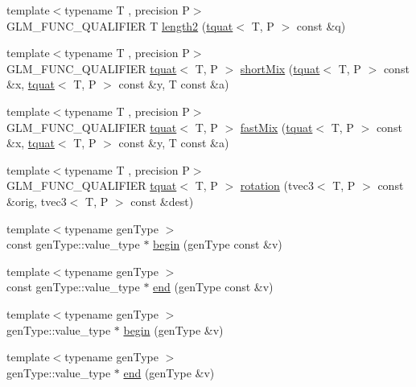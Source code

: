 \begin{DoxyCompactItemize}
\item 
{\footnotesize template$<$typename T , precision P$>$ }\\G\+L\+M\+\_\+\+F\+U\+N\+C\+\_\+\+Q\+U\+A\+L\+I\+F\+I\+E\+R T \hyperlink{group__gtx__quaternion_ga02b45352c7ac345cabc9e877314acda6}{length2} (\hyperlink{structglm_1_1tquat}{tquat}$<$ T, P $>$ const \&q)
\item 
{\footnotesize template$<$typename T , precision P$>$ }\\G\+L\+M\+\_\+\+F\+U\+N\+C\+\_\+\+Q\+U\+A\+L\+I\+F\+I\+E\+R \hyperlink{structglm_1_1tquat}{tquat}$<$ T, P $>$ \hyperlink{group__gtx__quaternion_ga3534443de2a1a806f386976546cddc81}{short\+Mix} (\hyperlink{structglm_1_1tquat}{tquat}$<$ T, P $>$ const \&x, \hyperlink{structglm_1_1tquat}{tquat}$<$ T, P $>$ const \&y, T const \&a)
\item 
{\footnotesize template$<$typename T , precision P$>$ }\\G\+L\+M\+\_\+\+F\+U\+N\+C\+\_\+\+Q\+U\+A\+L\+I\+F\+I\+E\+R \hyperlink{structglm_1_1tquat}{tquat}$<$ T, P $>$ \hyperlink{group__gtx__quaternion_gac11bf550f17d1da14423595a27575084}{fast\+Mix} (\hyperlink{structglm_1_1tquat}{tquat}$<$ T, P $>$ const \&x, \hyperlink{structglm_1_1tquat}{tquat}$<$ T, P $>$ const \&y, T const \&a)
\item 
{\footnotesize template$<$typename T , precision P$>$ }\\G\+L\+M\+\_\+\+F\+U\+N\+C\+\_\+\+Q\+U\+A\+L\+I\+F\+I\+E\+R \hyperlink{structglm_1_1tquat}{tquat}$<$ T, P $>$ \hyperlink{group__gtx__quaternion_gac4856d356c5c97cec74e9b672ea89240}{rotation} (tvec3$<$ T, P $>$ const \&orig, tvec3$<$ T, P $>$ const \&dest)
\item 
{\footnotesize template$<$typename gen\+Type $>$ }\\const gen\+Type\+::value\+\_\+type $\ast$ \hyperlink{group__gtx__range_ga774c16a37371658a2a1540faf9122839}{begin} (gen\+Type const \&v)
\item 
{\footnotesize template$<$typename gen\+Type $>$ }\\const gen\+Type\+::value\+\_\+type $\ast$ \hyperlink{group__gtx__range_ga97ffec4ea7e07302f11befff9cb37acd}{end} (gen\+Type const \&v)
\item 
{\footnotesize template$<$typename gen\+Type $>$ }\\gen\+Type\+::value\+\_\+type $\ast$ \hyperlink{group__gtx__range_gacc3851df89b9238430e39525c3518ced}{begin} (gen\+Type \&v)
\item 
{\footnotesize template$<$typename gen\+Type $>$ }\\gen\+Type\+::value\+\_\+type $\ast$ \hyperlink{group__gtx__range_ga0c303e8c522b139252646a93d5e490d4}{end} (gen\+Type \&v)

\end{DoxyCompactItemize}
